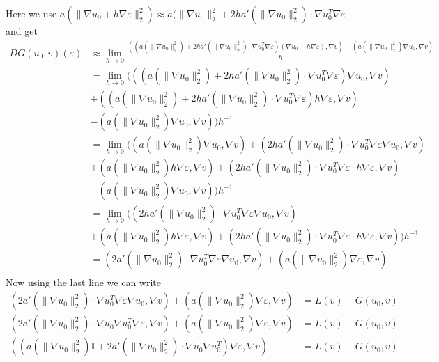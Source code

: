 \documentclass[a4paper]{article}
\begin{document}
Here we use $a(\|\nabla u_0+h\nabla \varepsilon\|_2^2)\approx a(\|\nabla u_0\|_2^2+2ha'(\|\nabla u_0\|_2^2)\cdot \nabla u_0^T\nabla \varepsilon$ and get
\begin{align*}
DG(u_0,v)(\varepsilon) &\approx \lim_{h\rightarrow 0} \frac{\left( (a\left(\|\nabla u_0 \|_2^2\right)+2ha'(\|\nabla u_0\|_2^2)\cdot \nabla u_0^T\nabla \varepsilon) \left(\nabla u_0+h\nabla \varepsilon\right),\nabla v\right) - \left(a\left(\|\nabla u_0\|_2^2\right) \nabla u_0 ,\nabla v\right)}{h} \\
%
&= \lim_{h\rightarrow 0} \Big(
\left( (a\left(\|\nabla u_0 \|_2^2\right)+2ha'(\|\nabla u_0\|_2^2)\cdot \nabla u_0^T\nabla \varepsilon) \nabla u_0,\nabla v\right) \\
&+\left( (a\left(\|\nabla u_0 \|_2^2\right)+2ha'(\|\nabla u_0\|_2^2)\cdot \nabla u_0^T\nabla \varepsilon) h\nabla \varepsilon,\nabla v\right) \\
&- \left(a\left(\|\nabla u_0\|_2^2\right) \nabla u_0 ,\nabla v\right)
\Big)h^{-1} \\
%
&= \lim_{h\rightarrow 0} \Big(
\left( a\left(\|\nabla u_0 \|_2^2\right) \nabla u_0,\nabla v\right)
+\left( 2ha'(\|\nabla u_0\|_2^2)\cdot \nabla u_0^T\nabla \varepsilon \nabla u_0,\nabla v\right) \\
&+\left( a\left(\|\nabla u_0 \|_2^2\right) h\nabla \varepsilon,\nabla v\right) 
+\left( 2ha'(\|\nabla u_0\|_2^2)\cdot \nabla u_0^T\nabla \varepsilon \cdot h\nabla\varepsilon,\nabla v\right) \\
&- \left(a\left(\|\nabla u_0\|_2^2\right) \nabla u_0 ,\nabla v\right)\Big)h^{-1} \\
&= \lim_{h\rightarrow 0} \Big(
\left( 2ha'(\|\nabla u_0\|_2^2)\cdot \nabla u_0^T\nabla \varepsilon \nabla u_0,\nabla v\right) \\
&+\left( a\left(\|\nabla u_0 \|_2^2\right) h\nabla \varepsilon,\nabla v\right) 
+\left( 2ha'(\|\nabla u_0\|_2^2)\cdot \nabla u_0^T\nabla \varepsilon \cdot h\nabla\varepsilon,\nabla v\right)\Big)h^{-1} \\
&= 
\left( 2a'(\|\nabla u_0\|_2^2)\cdot \nabla u_0^T\nabla \varepsilon \nabla u_0,\nabla v\right) 
+\left( a\left(\|\nabla u_0 \|_2^2\right) \nabla \varepsilon,\nabla v\right)  \\
\end{align*}
Now using the last line we can write
\begin{align*}
\left( 2a'(\|\nabla u_0\|_2^2)\cdot \nabla u_0^T\nabla \varepsilon \nabla u_0,\nabla v\right) 
+\left( a\left(\|\nabla u_0 \|_2^2\right) \nabla \varepsilon,\nabla v\right)  &= L(v)-G(u_0,v) \\
\left( 2a'(\|\nabla u_0\|_2^2)\cdot \nabla u_0 \nabla u_0^T\nabla \varepsilon,\nabla v\right) 
+\left( a\left(\|\nabla u_0 \|_2^2\right) \nabla \varepsilon,\nabla v\right)  &= L(v)-G(u_0,v) \\
\left( \left(a\left(\|\nabla u_0 \|_2^2\right)\mathbf{I}+2a'(\|\nabla u_0\|_2^2)\cdot \nabla u_0 \nabla u_0^T\right)\nabla \varepsilon,\nabla v\right) &= L(v)-G(u_0,v) \\
\end{align*}
\end{document}
